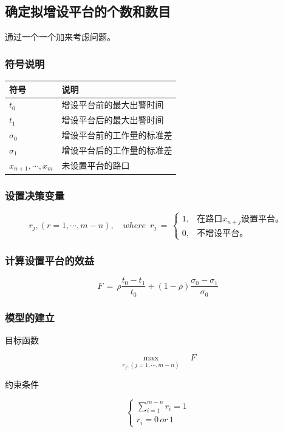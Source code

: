 \subsection{确定拟增设平台的个数和数目}
通过一个一个加来考虑问题。
\subsubsection{符号说明}
\begin{table}[h]
\begin{tabular}{ll}
\hline
符号 & 说明 \\ \hline
$t_0$ & 增设平台前的最大出警时间 \\
$t_1$ & 增设平台后的最大出警时间 \\
$\sigma_0$ & 增设平台前的工作量的标准差 \\
$\sigma_1$ & 增设平台后的工作量的标准差 \\
$x_{n+1},\cdots,x_{m}$ & 未设置平台的路口 \\ \hline
\end{tabular}
\end{table}
\subsubsection{设置决策变量}
\begin{equation*}
r_j,(r=1,\cdots,m-n),\quad where\,\,\,r_j\,=\,
\begin{cases}
1, & \text{在路口$x_{n+j}$设置平台。} \\
0, & \text{不增设平台。}
\end{cases}
\end{equation*}
\subsubsection{计算设置平台的效益}
$$F\,=\,\rho\frac{t_0-t_1}{t_0}+(1-\rho)\frac{\sigma_0-\sigma_1}{\sigma_0}$$
\subsubsection{模型的建立}
{\heiti 目标函数}\par
\begin{equation*}
\max_{r_j,(j=1,\cdots,m-n)}\quad F
\end{equation*}

{\heiti 约束条件}\par
\begin{equation*}
\begin{cases}
\sum_{i=1}^{m-n}r_i=1 \\
r_i=0 \,or\, 1
\end{cases}
\end{equation*}

